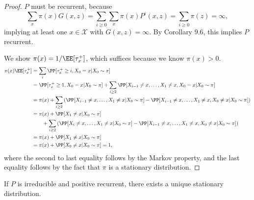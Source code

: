 \begin{proof}
$P$ must be recurrent, because 
\[\sum_x \pi(x)G(x,z) = \sum_{i\geq 0}\sum_x \pi(x)P^i(x,z) = \sum_{i\geq 0}\pi(z) = \infty,\]
implying at least one $x\in \mathcal{X}$ with $G(x,z)=\infty$. By Corollary $9.6$, this implies $P$ recurrent. 

We show $\pi(x) = 1/\EE[\tau_x^+]$, which suffices because we know $\pi(x) > 0$. 
\begin{align*}
    \pi(x)\EE[\tau_x^+] &= \sum_i \PP[\tau_x^+\geq i, X_0=x | X_0\sim \pi] \\
    &= \PP[\tau_x^+\geq 1, X_0=x | X_0\sim \pi] + \sum_{i\geq 2} \PP[X_{i-1}\neq x, \hdots, X_1\neq x, X_0=x | X_0\sim \pi] \\ 
    &= \pi(x) + \sum_{i\geq 2} \left(\PP[X_{i-1}\neq x, \hdots, X_1\neq x | X_0\sim \pi]-\PP[X_{i-1}\neq x, \hdots, X_1\neq x, X_0\neq x | X_0\sim \pi]\right) \\
    &= \pi(x) + \PP[X_1\neq x|X_0\sim \pi] \\
    &\qquad + \sum_{i\geq 2}\left(\PP[X_{i}\neq x, \hdots, X_1\neq x | X_0\sim \pi]-\PP[X_{i-1}\neq x, \hdots, X_1\neq x, X_0\neq x | X_0\sim \pi]\right) \\
    &= \pi(x) + \PP[X_1\neq x|X_0\sim \pi] \\
    &= \pi(x) + \PP[X_0\neq x|X_0\sim \pi] = 1,
\end{align*}
where the second to last equality follows by the Markov property, and the last equality follows by the fact that $\pi$ is a stationary distribution. 
\end{proof}

\begin{theorem}
\corlabel

If $P$ is irreducible and positive recurrent, there exists a unique stationary distribution. 
\end{theorem}
